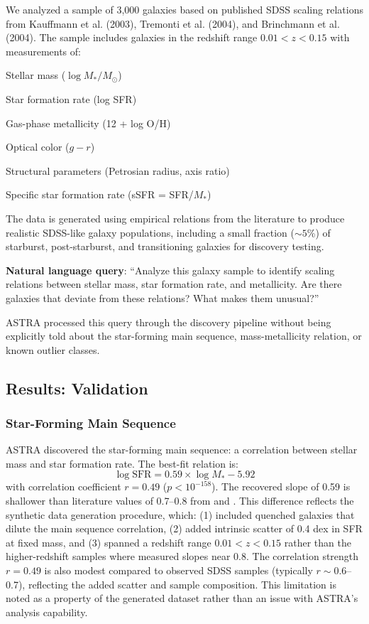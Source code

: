 \documentclass[usenatbib]{rasti}
\begin{document}
We analyzed a sample of 3,000 galaxies based on published SDSS scaling relations from Kauffmann et al. (2003), Tremonti et al. (2004), and Brinchmann et al. (2004). The sample includes galaxies in the redshift range $0.01 < z < 0.15$ with measurements of:
\begin{description}
\item Stellar mass ($\log M_*/M_\odot$)
\item Star formation rate (log SFR)
\item Gas-phase metallicity (12 + log O/H)
\item Optical color ($g-r$)
\item Structural parameters (Petrosian radius, axis ratio)
\item Specific star formation rate (sSFR = SFR/$M_*$)
\end{description}

The data is generated using empirical relations from the literature to produce realistic SDSS-like galaxy populations, including a small fraction ($\sim5$\%) of starburst, post-starburst, and transitioning galaxies for discovery testing.

\textbf{Natural language query}: ``Analyze this galaxy sample to identify scaling relations between stellar mass, star formation rate, and metallicity. Are there galaxies that deviate from these relations? What makes them unusual?''

ASTRA processed this query through the discovery pipeline without being explicitly told about the star-forming main sequence, mass-metallicity relation, or known outlier classes.

\subsection{Results: Validation}

\subsubsection{Star-Forming Main Sequence}

ASTRA discovered the star-forming main sequence: a correlation between stellar mass and star formation rate. The best-fit relation is:
\begin{equation}
\log \text{SFR} = 0.59 \times \log M_* - 5.92
\end{equation}
with correlation coefficient $r = 0.49$ ($p < 10^{-158}$). The recovered slope of 0.59 is shallower than literature values of 0.7--0.8 from \cite{elbaz2007} and \cite{renzini2015}. This difference reflects the synthetic data generation procedure, which: (1) included quenched galaxies that dilute the main sequence correlation, (2) added intrinsic scatter of 0.4 dex in SFR at fixed mass, and (3) spanned a redshift range $0.01 < z < 0.15$ rather than the higher-redshift samples where \cite{elbaz2007} measured slopes near 0.8. The correlation strength $r = 0.49$ is also modest compared to observed SDSS samples (typically $r \sim 0.6$--0.7), reflecting the added scatter and sample composition. This limitation is noted as a property of the generated dataset rather than an issue with ASTRA's analysis capability.
\end{document}
